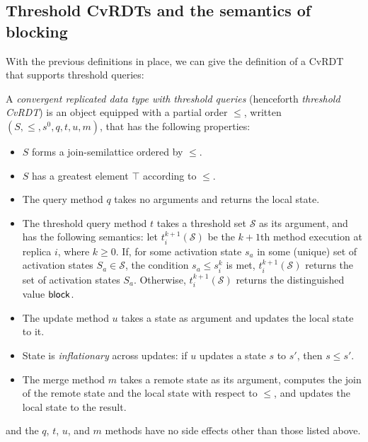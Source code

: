 \subsection{Threshold CvRDTs and the semantics of blocking}\label{ss:blocking}

With the previous definitions in place, we
can give the definition of a CvRDT that supports threshold queries:


\begin{definition}
  \label{def:cvrdt-with-threshold-queries}
  A \emph{convergent replicated data type with threshold queries}
  (henceforth \emph{threshold CvRDT}) is an object equipped
  with a partial order $\leq$, written $(S, \leq, s^0, q, t, u, m)$,
  that has the following properties:
  \begin{itemize}
    \item $S$ forms a join-semilattice ordered by $\leq$.
    \item $S$ has a greatest element $\top$ according to $\leq$.
    \item The query method $q$ takes no arguments and returns the
      local state.
    \item The threshold query method $t$ takes a threshold set
      $\mathcal{S}$ as its argument, and has the following semantics:
      let $t^{k+1}_i(\mathcal{S})$ be the $k+1$th method execution at
      replica $i$, where $k \geq 0$.  If, for some activation state
      $s_a$ in some (unique) set of activation states $S_a \in
      \mathcal{S}$, the condition $s_a \leq s^{k}_{i}$ is met,
      $t^{k+1}_i(\mathcal{S})$ returns the set of activation states
      $S_a$.  Otherwise, $t^{k+1}_i(\mathcal{S})$ returns the
      distinguished value $\textsf{block}$.
    \item The update method $u$ takes a state as argument and updates
      the local state to it.
    \item State is \emph{inflationary} across updates: if $u$ updates
      a state $s$ to $s'$, then $s \leq s'$.
    \item The merge method $m$ takes a remote state as its argument,
      computes the join of the remote state and the local state with
      respect to $\leq$, and updates the local state to the result.
  \end{itemize}
  and the $q$, $t$, $u$, and $m$ methods have no side effects other
  than those listed above.
\end{definition}
